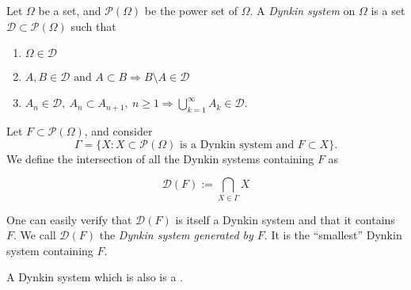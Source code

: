 \documentclass[12pt]{article}
\newcommand{\defined}{:=}
\newcommand{\set}[1]{\{#1\}}
\newcommand{\powerset}[1]{\mathcal{P}(#1)}
\begin{document}
Let $\Omega$ be a set, and $\powerset{\Omega}$ be the power set of $\Omega$.  A \emph{Dynkin system} on $\Omega$ is a set $\mathcal{D} \subset \powerset{\Omega}$ such that

\begin{enumerate}
\item{$\Omega \in \mathcal{D}$}
\item{$A,B \in \mathcal{D} \text{ and } A \subset B \Rightarrow B \setminus A \in \mathcal{D}$}
\item{$A_n \in \mathcal{D},\ A_n \subset A_{n+1},\ n \ge 1 \Rightarrow \bigcup_{k=1}^{\infty}A_k \in \mathcal{D}$}.
\end{enumerate}

Let $F \subset \powerset{\Omega}$, and consider
\begin{equation}
\Gamma = \set{X : X\subset\powerset{\Omega} \text{ is a Dynkin system and } F \subset X}.
\end{equation}
We define the intersection of all the Dynkin systems containing $F$ as

\begin{equation}
\mathcal{D}(F) \defined \bigcap_{X \in \Gamma} X
\end{equation}

One can easily verify that $\mathcal{D}(F)$ is itself a Dynkin system and that it contains $F$.  We call $\mathcal{D}(F)$ the \emph{Dynkin system generated by $F$}.  It is the ``smallest'' Dynkin system containing $F$.

A Dynkin system which is also  is a .
\end{document}

